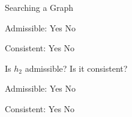 \begin{problem}{Searching a Graph}
\begin{question}[4]
Admissible: \hspace{5mm}
\solution{\emptycircle}{\ThreeCAdmissibleYes} Yes
\hspace{5mm}
\solution{\emptycircle}{\ThreeCAdmissibleNo} No

\solution{}{\ThreeCAdmissibleReason}

Consistent: \hspace{5mm}
\solution{\emptycircle}{\ThreeCConsistentYes} Yes
\hspace{5mm}
\solution{\emptycircle}{\ThreeCConsistentNo} No

\solution{}{\ThreeCConsistentReason}

\end{question}

\begin{question}[4]
Is $h_2$ admissible? Is it consistent?

Admissible: \hspace{5mm}
\solution{\emptycircle}{\ThreeDAdmissibleYes} Yes
\hspace{5mm}
\solution{\emptycircle}{\ThreeDAdmissibleNo} No

\solution{}{\ThreeDAdmissibleReason}

Consistent: \hspace{5mm}
\solution{\emptycircle}{\ThreeDConsistentYes} Yes
\hspace{5mm}
\solution{\emptycircle}{\ThreeDConsistentNo} No

\solution{}{\ThreeDConsistentReason}


\end{question}





\end{problem}

